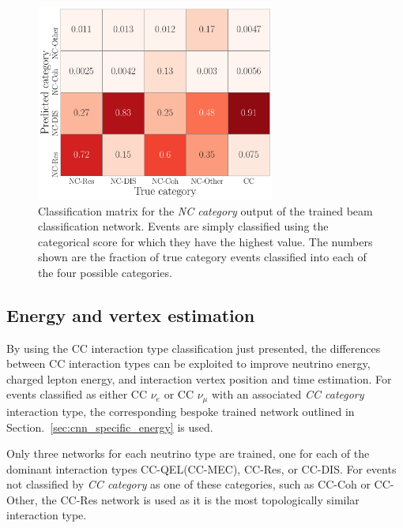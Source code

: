\begin{figure} %
    \includegraphics[width=0.7\textwidth]{diagrams/7-results/final_nc_cat_confusion.pdf}
    \caption[Classification matrix for the NC category output of the beam classification network]
    {Classification matrix for the \emph{NC category} output of the trained beam classification
        network. Events are simply classified using the categorical score for which they have the
        highest value. The numbers shown are the fraction of true category events classified into
        each of the four possible categories.}
    \label{fig:final_nc_cat_confusion}
\end{figure}

\subsection{Energy and vertex estimation} %
\label{sec:results_eval_energy} %

By using the CC interaction type classification just presented, the differences between CC
interaction types can be exploited to improve neutrino energy, charged lepton energy, and
interaction vertex position and time estimation. For events classified as either CC $\nu_{e}$ or
CC $\nu_{\mu}$ with an associated \emph{CC category} interaction type, the corresponding bespoke
trained network outlined in Section.~\ref{sec:cnn_specific_energy} is used.

Only three networks for each neutrino type are trained, one for each of the dominant interaction
types CC-QEL(CC-MEC), CC-Res, or CC-DIS. For events not classified by \emph{CC category} as one of
these categories, such as CC-Coh or CC-Other, the CC-Res network is used as it is the most
topologically similar interaction type.

